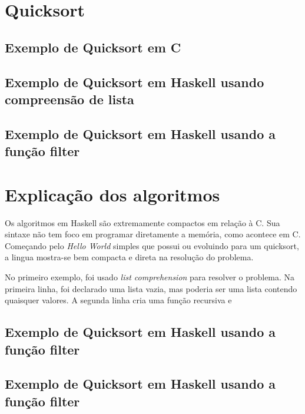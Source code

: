 \documentclass[
  article,			       %
  12pt,				         %
  oneside,			       %
  a4paper,			       %
  english,		       	 %
  brazil,			      	 %
  sumario=tradicional
]{abntex2}
\begin{document}
    \section{Quicksort}
      \subsection{Exemplo de Quicksort em C}


      
      \subsection{Exemplo de Quicksort em Haskell usando compreensão de lista} 

            

      \newpage

      \subsection{Exemplo de Quicksort em Haskell usando a função filter}

      

      \section{Explicação dos algoritmos}
      Os algoritmos em Haskell são extremamente compactos em relação à C. Sua sintaxe não tem foco
      em programar diretamente a memória, como acontece em C. Começando pelo \emph{Hello World} simples que possui ou evoluindo
      para um quicksort, a lingua mostra-se bem compacta e direta na resolução do problema.

      No primeiro exemplo, foi usado \emph{list comprehension} para resolver o problema. Na primeira linha,
      foi declarado uma lista vazia, mas poderia ser uma lista contendo quaisquer valores. A segunda linha
      cria uma função recursiva e 

      \subsection{Exemplo de Quicksort em Haskell usando a função filter}

      

      \newpage

      \subsection{Exemplo de Quicksort em Haskell usando a função filter} 
\end{document}
